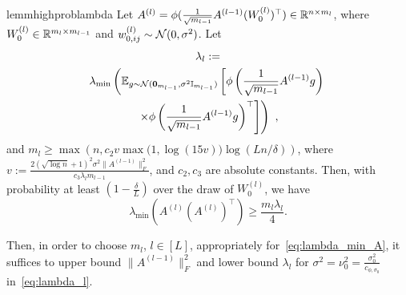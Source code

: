 \begin{restatable}{lemm}{highproblambda}
Let $A^{(l)} = \phi( \frac{1}{\sqrt{m_{l-1}}} A^{(l-1)} (W_0^{(l)})^\top) \in \mathbb{R}^{n \times m_l}$, where $W_0^{(l)} \in \mathbb{R}^{m_{l} \times m_{l-1}}$ and $w_{0,ij}^{(l)} \sim {\cal N}(0,\sigma^2)$. Let
\begin{multline}
\lambda_l := \\\lambda_{\min}\left(  \mathbb{E}_{g \sim {\cal N}(\bm{0}_{m_{l-1}},\sigma^2 \mathbb{I}_{m_{l-1}})}
\left[ \phi \left( \frac{1}{\sqrt{m_{l-1}}} A^{(l-1)} g \right)\right.\right.\\ 
\left.\left. \times\phi\left( \frac{1}{\sqrt{m_{l-1}}} A^{(l-1)} g \right)^\top \right] \right) ~,
\label{eq:lambda_l}
\end{multline}
and
$m_{l} \geq \max ( n, c_2 v \max\big(1, \log(15 v)\big) \log (Ln/\delta) )$,
where $v := \frac{2(\sqrt{\log n}+1)^2 \sigma^2 \| A^{(l-1)}\|_F^2}{c_3 \lambda_l m_{l-1}}$, and $c_2, c_3$ are absolute constants. Then, with probability at least $(1-\frac{\delta}{L})$ over the draw of $W^{(l)}_0$, we have 
\begin{equation}
\label{eq:lambda_min_A}
\lambda_{\min}( A^{(l)} (A^{(l)})^\top ) \geq \frac{m_{l} \lambda_l}{4}.
\end{equation}
\label{lemm:highproblambda}
\end{restatable}
Then, in order to choose $m_l$, $l\in[L]$, appropriately for~\eqref{eq:lambda_min_A}, it suffices to upper bound $\| A^{(l-1)} \|_F^2$ and lower bound $\lambda_l$ for $\sigma^2 = \nu_0^2 = \frac{\sigma_0^2}{c_{\phi,\sigma_0}}$ in~\eqref{eq:lambda_l}.

